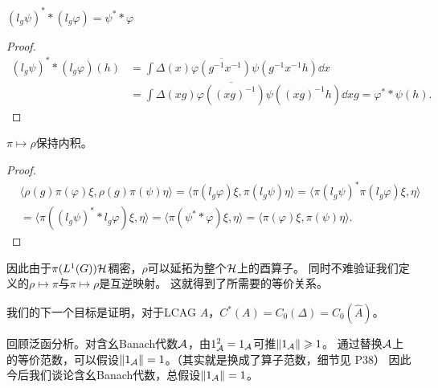 \begin{proposition}
    $(l_g\psi)^* * (l_g\varphi) = \psi^* * \varphi$
\end{proposition}
\begin{proof}
    \begin{align*}
        (l_g\psi)^* * (l_g\varphi) (h) &= \int \Delta(x)\overline{\varphi(g^{-1}x^{-1})}\psi(g^{-1}x^{-1}h)\dd x \\
        &= \int \Delta(xg)\overline{\varphi((xg)^{-1})}\psi((xg)^{-1}h)\dd xg = \varphi^* * \psi(h).
    \end{align*}
\end{proof}
\begin{lemma}
    $\pi \mapsto \rho$保持内积。
\end{lemma}
\begin{proof}
    \begin{align*}
        &\langle \rho(g)\pi(\varphi)\xi,\rho(g)\pi(\psi)\eta \rangle 
        = \langle \pi(l_g\varphi)\xi,\pi(l_g\psi)\eta \rangle 
        = \langle \pi(l_g\psi)^*\pi(l_g\varphi)\xi,\eta \rangle \\
        &= \langle \pi((l_g\psi)^* * l_g\varphi)\xi,\eta \rangle
        = \langle \pi(\psi^* * \varphi)\xi,\eta \rangle 
        = \langle \pi(\varphi)\xi,\pi(\psi)\eta \rangle. 
    \end{align*}
\end{proof}
因此由于$\pi(L^1(G))\mathcal{H}$稠密，$\rho$可以延拓为整个$\mathcal{H}$上的酉算子。
同时不难验证我们定义的$\rho \mapsto \pi$与$\pi \mapsto \rho$是互逆映射。
这就得到了所需要的等价关系。

我们的下一个目标是证明，对于LCAG $A$，$C^*(A) = C_0(\Delta) = C_0(\hat{A})$。

回顾泛函分析。对含幺Banach代数$\mathcal{A}$，由$1_{\mathcal{A}}^2 = 1_{\mathcal{A}}$可推$\|1_{\mathcal{A}}\| \geqslant 1$。
通过替换$\mathcal{A}$上的等价范数，可以假设$\|1_{\mathcal{A}}\| = 1$。（其实就是换成了算子范数，细节见\cite{Pr} P38）
因此今后我们谈论含幺Banach代数，总假设$\|1_{\mathcal{A}}\| = 1$。

